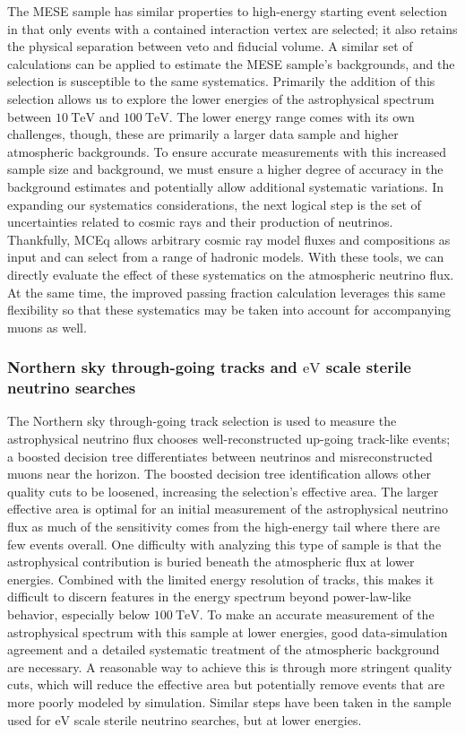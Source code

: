 The MESE sample has similar properties to high-energy starting event selection in that only events with a contained interaction vertex are selected; it also retains the physical separation between veto and fiducial volume.
A similar set of calculations can be applied to estimate the MESE sample's backgrounds, and the selection is susceptible to the same systematics.
Primarily the addition of this selection allows us to explore the lower energies of the astrophysical spectrum between $\SI{10}\TeV$ and $\SI{100}\TeV$.
The lower energy range comes with its own challenges, though, these are primarily a larger data sample and higher atmospheric backgrounds.
To ensure accurate measurements with this increased sample size and background, we must ensure a higher degree of accuracy in the background estimates and potentially allow additional systematic variations.
In expanding our systematics considerations, the next logical step is the set of uncertainties related to cosmic rays and their production of neutrinos.
Thankfully, MCEq allows arbitrary cosmic ray model fluxes and compositions as input and can select from a range of hadronic models. With these tools, we can directly evaluate the effect of these systematics on the atmospheric neutrino flux.
At the same time, the improved passing fraction calculation leverages this same flexibility so that these systematics may be taken into account for accompanying muons as well.

\subsubsection{Northern sky through-going tracks and $\si\eV$ scale sterile neutrino searches}
The Northern sky through-going track selection is used to measure the astrophysical neutrino flux chooses well-reconstructed up-going track-like events; a boosted decision tree differentiates between neutrinos and misreconstructed muons near the horizon.
The boosted decision tree identification allows other quality cuts to be loosened, increasing the selection's effective area.
The larger effective area is optimal for an initial measurement of the astrophysical neutrino flux as much of the sensitivity comes from the high-energy tail where there are few events overall.
One difficulty with analyzing this type of sample is that the astrophysical contribution is buried beneath the atmospheric flux at lower energies.
Combined with the limited energy resolution of tracks, this makes it difficult to discern features in the energy spectrum beyond power-law-like behavior, especially below $\SI{100}\TeV$.
To make an accurate measurement of the astrophysical spectrum with this sample at lower energies, good data-simulation agreement and a detailed systematic treatment of the atmospheric background are necessary.
A reasonable way to achieve this is through more stringent quality cuts, which will reduce the effective area but potentially remove events that are more poorly modeled by simulation.
Similar steps have been taken in the sample used for $\si\eV$ scale sterile neutrino searches, but at lower energies.

